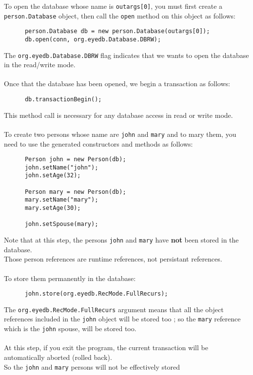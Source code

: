 To open the database whose name is \texttt{outargs[0]}, you must first
create a \texttt{person.Database} object, then call the \texttt{open}
method on this object as follows:
{\verbsize \begin{verbatim}
      person.Database db = new person.Database(outargs[0]);
      db.open(conn, org.eyedb.Database.DBRW);
\end{verbatim}
}
The \texttt{org.eyedb.Database.DBRW} flag indicates that we wants to open
the database in the read/write mode.
\\
\\
Once that the database has been opened, we begin a transaction as follows:
{\verbsize \begin{verbatim}
      db.transactionBegin();
\end{verbatim}
}
This method call is necessary for any database access in read or write
mode.
\\
\\
To create two persons whose name are \texttt{john} and \texttt{mary} and
to mary them, you need to use the generated constructors and methods
as follows:
{\verbsize \begin{verbatim}
      Person john = new Person(db);
      john.setName("john");
      john.setAge(32);
     
      Person mary = new Person(db);
      mary.setName("mary");
      mary.setAge(30);
     
      john.setSpouse(mary);
\end{verbatim}
}
Note that at this step, the persons \texttt{john} and \texttt{mary} have
{\bf not} been stored in the database.
\\
Those person references are runtime references, not persistant references.
\\
\\
To store them permanently in the database:
{\verbsize \begin{verbatim}
      john.store(org.eyedb.RecMode.FullRecurs);
\end{verbatim}
}
The \texttt{org.eyedb.RecMode.FullRecurs} argument means that all the object
references included in the \texttt{john} object will be stored too ; so
the \texttt{mary} reference which is the \texttt{john} spouse, will be stored too.
\\
\\
At this step, if you exit the program, the current transaction will
be automatically aborted (rolled back).
\\
So the \texttt{john} and \texttt{mary} persons will not be effectively stored
